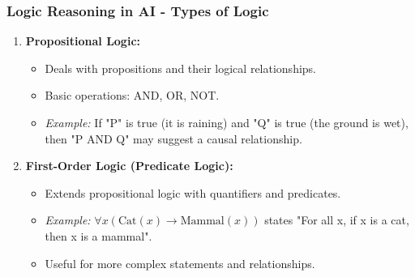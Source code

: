 \documentclass[aspectratio=169]{beamer}
\begin{document}
\begin{frame}[fragile]
    \frametitle{Logic Reasoning in AI - Types of Logic}
    \begin{enumerate}
        \item \textbf{Propositional Logic:}
        \begin{itemize}
            \item Deals with propositions and their logical relationships.
            \item Basic operations: AND, OR, NOT.
            \item \textit{Example:} If "P" is true (it is raining) and "Q" is true (the ground is wet), then "P AND Q" may suggest a causal relationship.
        \end{itemize}
        
        \item \textbf{First-Order Logic (Predicate Logic):}
        \begin{itemize}
            \item Extends propositional logic with quantifiers and predicates.
            \item \textit{Example:} $\forall x (\text{Cat}(x) \rightarrow \text{Mammal}(x))$ states "For all x, if x is a cat, then x is a mammal".
            \item Useful for more complex statements and relationships.
        \end{itemize}
    \end{enumerate}
\end{frame}
\end{document}
